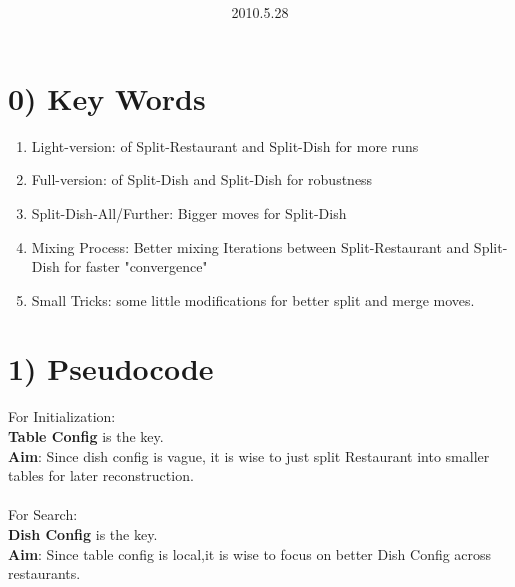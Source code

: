 \documentclass{article}
\title{\vspace{0.3in}\textmd{\textbf{\hmwkTitle}}}
\date{2010.5.28}
\author{\textbf{\hmwkAuthorName}}
\begin{document}
\begin{spacing}{1.1}
\maketitle

\section{0) Key Words}

\begin{enumerate}
\item  Light-version: of Split-Restaurant and Split-Dish for more runs
\item  Full-version: of Split-Dish and Split-Dish for robustness
\item  Split-Dish-All/Further: Bigger moves for Split-Dish
\item  Mixing Process: Better mixing Iterations between Split-Restaurant and Split-Dish for faster "convergence"
\item  Small Tricks: some little modifications for better split and merge moves.
\end{enumerate}


\section{1) Pseudocode}
For Initialization:\\
{\bf Table Config} is the key.\\
{\bf Aim}: Since dish config is vague, it is wise to just split Restaurant into smaller tables for later reconstruction.\\ \\
For Search:\\
{\bf Dish Config} is the key.\\
{\bf Aim}: Since table config is local,it is wise to focus on better Dish Config across restaurants.\\



\end{spacing}
\end{document}
